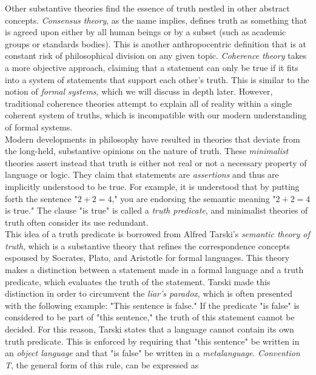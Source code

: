 \begin{tcolorbox}[breakable, enhanced, colback=textbook-blue, sharp corners]
	Other substantive theories find the essence of truth nestled in other abstract concepts. \textit{Consensus theory}, as the name implies, defines truth as something that is agreed upon either by all human beings or by a subset (such as academic groups or standards bodies). This is another anthropocentric definition that is at constant risk of philosophical division on any given topic. \textit{Coherence theory} takes a more objective approach, claiming that a statement can only be true if it fits into a system of statements that support each other's truth. This is similar to the notion of \textit{formal systems}, which we will discuss in depth later. However, traditional coherence theories attempt to explain all of reality within a single coherent system of truths, which is incompatible with our modern understanding of formal systems. \\
	
	Modern developments in philosophy have resulted in theories that deviate from the long-held, substantive opinions on the nature of truth. These \textit{minimalist} theories assert instead that truth is either not real or not a necessary property of language or logic. They claim that statements are \textit{assertions} and thus are implicitly understood to be true. For example, it is understood that by putting forth the sentence "$2+2=4$," you are endorsing the semantic meaning "$2+2=4$ is true." The clause "is true" is called a \textit{truth predicate}, and minimalist theories of truth often consider its use redundant. \\
	
	This idea of a truth predicate is borrowed from Alfred Tarski's \textit{semantic theory of truth}, which is a substantive theory that refines the correspondence concepts espoused by Socrates, Plato, and Aristotle for formal languages. This theory makes a distinction between a statement made in a formal language and a truth predicate, which evaluates the truth of the statement. Tarski made this distinction in order to circumvent the \textit{liar's paradox}, which is often presented with the following example: "This sentence is false." If the predicate "is false" is considered to be part of "this sentence," the truth of this statement cannot be decided. For this reason, Tarski states that a language cannot contain its own truth predicate. This is enforced by requiring that "this sentence" be written in an \textit{object language} and that "is false" be written in a \textit{metalanguage}. \textit{Convention T}, the general form of this rule, can be expressed as
	

\end{tcolorbox}
